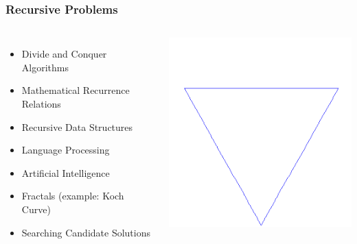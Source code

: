 \documentclass{beamer}
\begin{document}
\begin{frame}
    \frametitle{Recursive Problems}
    \begin{columns}
        \begin{itemize}[<+->]
            \item Divide and Conquer Algorithms
            \item Mathematical Recurrence Relations
            \item Recursive Data Structures
            \item Language Processing
            \item Artificial Intelligence
            \item Fractals (example: Koch Curve)
            \item Searching Candidate Solutions
        \end{itemize}
        \begin{overprint}
        \includegraphics[width=\textwidth]{images/koch-0}

\end{overprint}
\end{columns}
\end{frame}
\end{document}
